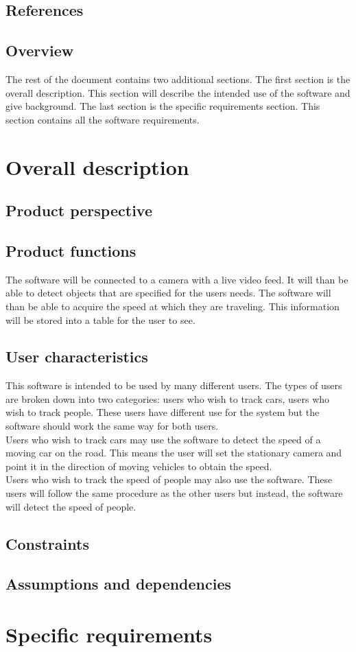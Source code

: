 \documentclass[letterpaper,10pt,onecolumn,draftclsnofoot]{IEEEtran}
\begin{document}
\subsection{References}

\subsection{Overview}
The rest of the document contains two additional sections.
The first section is the overall description.
This section will describe the intended use of the software and give background.
The last section is the specific requirements section.
This section contains all the software requirements.

\section{Overall description}
\subsection{Product perspective}

\subsection{Product functions}
The software will be connected to a camera with a live video feed.
It will than be able to detect objects that are specified for the users needs.
The software will than be able to acquire the speed at which they are traveling.
This information will be stored into a table for the user to see.


\subsection{User characteristics}
This software is intended to be used by many different users.
The types of users are broken down into two categories: users who wish to track cars, users who wish to track people.
These users have different use for the system but the software should work the same way for both users.\\

Users who wish to track cars may use the software to detect the speed of a moving car on the road.
This means the user will set the stationary camera and point it in the direction of moving vehicles to obtain the speed.\\

Users who wish to track the speed of people may also use the software.
These users will follow the same procedure as the other users but instead, the software will detect the speed of people.
\subsection{Constraints}

\subsection{Assumptions and dependencies}

\section{Specific requirements}
\end{document}
